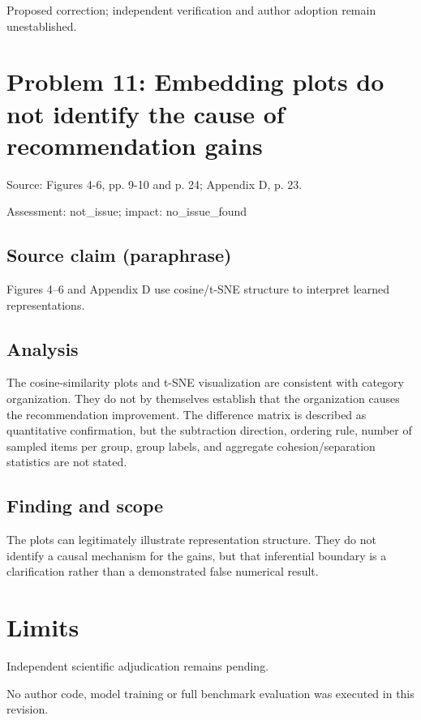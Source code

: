 \documentclass[11pt]{article}
\begin{document}
Proposed correction; independent verification and author adoption remain unestablished.

\section*{Problem 11: Embedding plots do not identify the cause of recommendation gains}

Source: Figures 4-6, pp. 9-10 and p. 24; Appendix D, p. 23.

Assessment: not\_issue; impact: no\_issue\_found

\subsection*{Source claim (paraphrase)}

Figures 4--6 and Appendix D use cosine/t-SNE structure to interpret learned representations.

\subsection*{Analysis}

The cosine-similarity plots and t-SNE visualization are consistent with category organization. They do not by themselves establish that the organization causes the recommendation improvement. The difference matrix is described as quantitative confirmation, but the subtraction direction, ordering rule, number of sampled items per group, group labels, and aggregate cohesion/separation statistics are not stated.

\subsection*{Finding and scope}

The plots can legitimately illustrate representation structure. They do not identify a causal mechanism for the gains, but that inferential boundary is a clarification rather than a demonstrated false numerical result.

\section*{Limits}

Independent scientific adjudication remains pending.\par

No author code, model training or full benchmark evaluation was executed in this revision.\par
\end{document}
